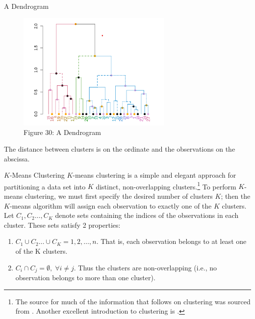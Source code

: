 \documentclass[pdf]{beamer}
\theoremstyle{remark}
\theoremstyle{definition}
\begin{document}
\begin{frame}[t]{A Dendrogram}
\begin{figure}[htbp]
  \captionsetup{justification=centering}
  \includegraphics[height=5.8cm, trim=0.0cm 0.0cm 0.0cm 0.0cm width=5.8cm]{Images/Dendrogram_Example.png}
  \caption{Figure {\color{franklinblue} 30}: A Dendrogram}
\end{figure}
\vspace{-2.0ex}
The distance between clusters is on the ordinate and the observations on the abscissa.
\end{frame}

\begin{frame}[t]{$K$-Means Clustering}
$K$-means clustering is a simple and elegant approach for partitioning a
data set into $K$ distinct, non-overlapping clusters.\footnote{The source for much of the information that follows on clustering was sourced from \cite{hastie2009}.  Another excellent introduction to clustering is \cite{everitt2011}.} To perform $K$-means clustering, we must first specify the desired number of clusters $K$; then the $K$-means algorithm will assign each observation to exactly one of the $K$ clusters. \\
\vspace{1.5ex}
Let $C_1, C_2 \ldots, C_K$ denote sets containing the indices of the observations in each cluster. These sets satisfy 2 properties: \\
\vspace{0.0ex}
\small
\begin{enumerate}
\item $C_1 \cup C_2 \ldots \cup C_K = {1,2,\ldots,n}$.  That is, each observation
belongs to at least one of the K clusters.
\item $C_i \cap C_j = \emptyset, \; \forall i \neq j$. Thus the clusters are non-overlapping (i.e., no observation belongs to more than one cluster).
\end{enumerate}
\end{frame}
\end{document}
